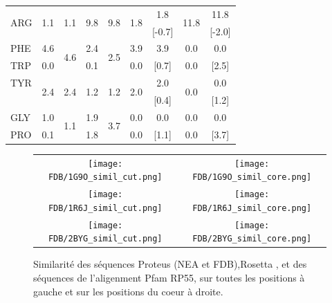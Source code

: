 \begin{table}
\begin{tabular}{l|cccc|cccc}
\hline
\multirow{2}{*}{ARG} & \multirow{2}{*}{1.1} & \multirow{2}{*}{1.1}   & \multirow{2}{*}{9.8}  & \multirow{2}{*}{9.8}   & \multirow{2}{*}{1.8} & 1.8                      & \multirow{2}{*}{11.8} & 11.8    \\
                     &                      &                        &                      &                         &                      & [-0.7]                    &                      & [-2.0]   \\
\hline
PHE                  & 4.6                  & \multirow{2}{*}{4.6}   & 2.4                  & \multirow{2}{*}{2.5}    &  3.9                 & 3.9                      & 0.0 & 0.0 \\
TRP                  & 0.0                  &                        & 0.1                  &                         &  0.0                 & [0.7]                    & 0.0 & [2.5]               \\
\hline
TYR                  & \multirow{2}{*}{2.4} & \multirow{2}{*}{2.4}  & \multirow{2}{*}{1.2}  &   \multirow{2}{*}{1.2}  &  \multirow{2}{*}{2.0} & 2.0                     & \multirow{2}{*}{0.0}  & 0.0   \\
                     &                      &                        &                      &                         &                       & [0.4]                   &                      & [1.2]  \\
\hline
GLY                  & 1.0                  & \multirow{2}{*}{1.1}   & 1.9                  & \multirow{2}{*}{3.7}    &   0.0                &  0.0                     & 0.0 & 0.0 \\
PRO                  & 0.1                  &                        & 1.8                  &                         &   0.0                &  [1.1]                   & 0.0 & [3.7]\\
\hline

\end{tabular} 
\end{table}

   \begin{figure}[t]
     \centering
     \begin{tabular}{cc} 
       \texttt{[image: FDB/1G9O\_simil\_cut.png]} &
       \texttt{[image: FDB/1G9O\_simil\_core.png]} \\
       \texttt{[image: FDB/1R6J\_simil\_cut.png]} &
       \texttt{[image: FDB/1R6J\_simil\_core.png]} \\
       \texttt{[image: FDB/2BYG\_simil\_cut.png]} &
       \texttt{[image: FDB/2BYG\_simil\_core.png]} \\
     \end{tabular}
     \caption{Similarité des séquences Proteus (NEA et FDB),Rosetta , et des séquences de l'aligenment Pfam RP55, sur toutes les positions à gauche  et sur les positions du coeur à droite.}

     \label{graph:Simil_control_B}
   \end{figure}
    
